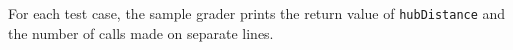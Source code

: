 For each test case, the sample grader prints the return value of \texttt{hubDistance} and the number of calls made on separate lines.
